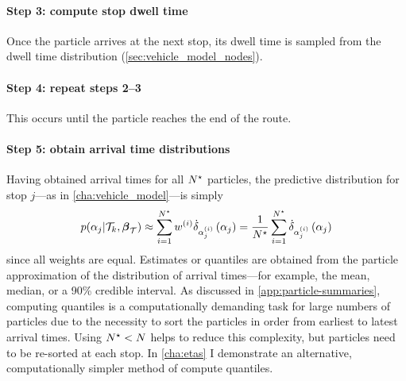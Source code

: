 \paragraph{Step 3: compute stop dwell time}
Once the particle arrives at the next stop, its dwell time is sampled from the dwell time distribution (\cref{sec:vehicle_model_nodes}).

\paragraph{Step 4: repeat steps 2--3}
This occurs until the particle reaches the end of the route.

\paragraph{Step 5: obtain arrival time distributions}


Having obtained arrival times for all $N^\star$ particles, the predictive distribution for stop $j$---as in \cref{cha:vehicle_model}---is simply
\begin{equation}
\label{eq:particle_predictive_dist}
p(\alpha_j | \mathcal{T}_k, \boldsymbol\beta_{\mathcal{T}}) \approx
\sum_{i=1}^{N^\star} w^{(i)} \dot\delta_{\alpha_j^{(i)}}\left(\alpha_j\right)
= \frac{1}{N^\star}\sum_{i=1}^{N^\star} \dot\delta_{\alpha_j^{(i)}}\left(\alpha_j\right)
\end{equation}
since all weights are equal. Estimates or quantiles are obtained from the particle approximation of the distribution of arrival times---for example, the mean, median, or a 90\% credible interval. As discussed in \cref{app:particle-summaries}, computing quantiles is a computationally demanding task for large numbers of particles due to the necessity to sort the particles in order from earliest to latest arrival times. Using $N^\star < N$ helps to reduce this complexity, but particles need to be re-sorted at each stop. In \cref{cha:etas} I demonstrate an alternative, computationally simpler method of compute quantiles.

